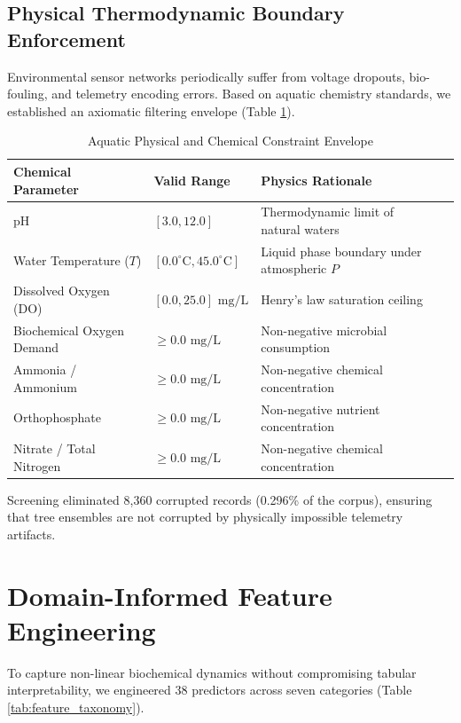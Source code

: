 \documentclass[conference]{IEEEtran}
\begin{document}
\subsection{Physical Thermodynamic Boundary Enforcement}
Environmental sensor networks periodically suffer from voltage dropouts, bio-fouling, and telemetry encoding errors. Based on aquatic chemistry standards, we established an axiomatic filtering envelope (Table \ref{tab:physics_bounds}).

\begin{table}[htbp]
\caption{Aquatic Physical and Chemical Constraint Envelope}
\label{tab:physics_bounds}
\centering
\begin{tabular}{llll}
\toprule
\textbf{Chemical Parameter} & \textbf{Valid Range} & \textbf{Physics Rationale} \\
\midrule
pH & $[3.0, 12.0]$ & Thermodynamic limit of natural waters \\
Water Temperature ($T$) & $[0.0^\circ\text{C}, 45.0^\circ\text{C}]$ & Liquid phase boundary under atmospheric $P$ \\
Dissolved Oxygen (DO) & $[0.0, 25.0]\text{ mg/L}$ & Henry's law saturation ceiling \\
Biochemical Oxygen Demand & $\ge 0.0\text{ mg/L}$ & Non-negative microbial consumption \\
Ammonia / Ammonium & $\ge 0.0\text{ mg/L}$ & Non-negative chemical concentration \\
Orthophosphate & $\ge 0.0\text{ mg/L}$ & Non-negative nutrient concentration \\
Nitrate / Total Nitrogen & $\ge 0.0\text{ mg/L}$ & Non-negative chemical concentration \\
\bottomrule
\end{tabular}
\end{table}

Screening eliminated 8,360 corrupted records (0.296\% of the corpus), ensuring that tree ensembles are not corrupted by physically impossible telemetry artifacts.

\section{Domain-Informed Feature Engineering}
To capture non-linear biochemical dynamics without compromising tabular interpretability, we engineered 38 predictors across seven categories (Table \ref{tab:feature_taxonomy}).
\end{document}
